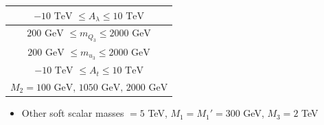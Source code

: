 \documentclass[10pt,aspectratio=169]{beamer}
\begin{document}
\begin{frame}
\begin{columns}
\begin{column}{0.4\textwidth}
\begin{table}[h]
\begin{tabulary}{\textwidth}{C}
          \midrule
          $-10\textrm{ TeV } \leq A_\lambda \leq 10\textrm{ TeV}$ \\
          \midrule
          $ 200 \textrm{ GeV } \leq m_{Q_3} \leq 2000 \textrm { GeV}$\\
          \midrule
          $ 200 \textrm{ GeV } \leq m_{u_3} \leq 2000 \textrm { GeV}$\\
          \midrule
          $-10 \textrm{ TeV } \leq A_t \leq 10 \textrm { TeV}$\\
          \midrule
          $M_2=100\textrm{ GeV, } 1050\textrm{ GeV, } 2000 \textrm{ GeV}$ \\
          \bottomrule
        \end{tabulary}
      \end{table}
      \begin{itemize}
        \item Other soft scalar masses $= 5$ TeV, $M_1 = M_1' = 300$ GeV,
          $M_3 = 2$ TeV
      \end{itemize}
    \end{column}
  \end{columns}
\end{frame}
\end{document}
